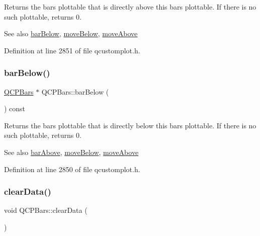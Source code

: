 Returns the bars plottable that is directly above this bars plottable. If there is no such plottable, returns 0.

\begin{DoxySeeAlso}{See also}
\hyperlink{class_q_c_p_bars_a1b58664864b141f45e02044a855b3213}{bar\+Below}, \hyperlink{class_q_c_p_bars_a69fc371346980f19177c3d1ecdad78ee}{move\+Below}, \hyperlink{class_q_c_p_bars_ac22e00a6a41509538c21b04f0a57318c}{move\+Above} 
\end{DoxySeeAlso}


Definition at line 2851 of file qcustomplot.\+h.

\mbox{\label{class_q_c_p_bars_a1b58664864b141f45e02044a855b3213}} 
\subsubsection{\texorpdfstring{bar\+Below()}{barBelow()}}
{\footnotesize\ttfamily \hyperlink{class_q_c_p_bars}{Q\+C\+P\+Bars} $\ast$ Q\+C\+P\+Bars\+::bar\+Below (\begin{DoxyParamCaption}{ }\end{DoxyParamCaption}) const\hspace{0.3cm}{\ttfamily [inline]}}

Returns the bars plottable that is directly below this bars plottable. If there is no such plottable, returns 0.

\begin{DoxySeeAlso}{See also}
\hyperlink{class_q_c_p_bars_ab97f2acd9f6cb40d2cc3c33d278f0e78}{bar\+Above}, \hyperlink{class_q_c_p_bars_a69fc371346980f19177c3d1ecdad78ee}{move\+Below}, \hyperlink{class_q_c_p_bars_ac22e00a6a41509538c21b04f0a57318c}{move\+Above} 
\end{DoxySeeAlso}


Definition at line 2850 of file qcustomplot.\+h.

\mbox{\label{class_q_c_p_bars_a11dbbd707132f07f862dff13c5789c2b}} 
\subsubsection{\texorpdfstring{clear\+Data()}{clearData()}}
{\footnotesize\ttfamily void Q\+C\+P\+Bars\+::clear\+Data (\begin{DoxyParamCaption}{ }\end{DoxyParamCaption})\hspace{0.3cm}{\ttfamily [virtual]}}

